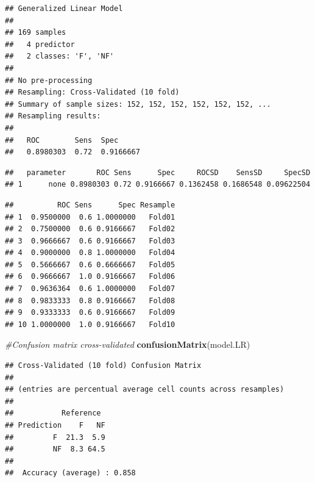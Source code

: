 \documentclass[
]{book}
\newenvironment{Shaded}{\begin{snugshade}}{\end{snugshade}}
\newcommand{\CommentTok}[1]{\textcolor[rgb]{0.56,0.35,0.01}{\textit{#1}}}
\newcommand{\FunctionTok}[1]{\textcolor[rgb]{0.13,0.29,0.53}{\textbf{#1}}}
\newcommand{\NormalTok}[1]{#1}
\newcommand{\SpecialCharTok}[1]{\textcolor[rgb]{0.81,0.36,0.00}{\textbf{#1}}}
\newcounter{none} %
\begin{document}
\begin{verbatim}
## Generalized Linear Model 
## 
## 169 samples
##   4 predictor
##   2 classes: 'F', 'NF' 
## 
## No pre-processing
## Resampling: Cross-Validated (10 fold) 
## Summary of sample sizes: 152, 152, 152, 152, 152, 152, ... 
## Resampling results:
## 
##   ROC        Sens  Spec     
##   0.8980303  0.72  0.9166667
\end{verbatim}

\begin{Shaded}
\end{Shaded}

\begin{verbatim}
##   parameter       ROC Sens      Spec     ROCSD    SensSD     SpecSD
## 1      none 0.8980303 0.72 0.9166667 0.1362458 0.1686548 0.09622504
\end{verbatim}

\begin{Shaded}
\end{Shaded}

\begin{verbatim}
##          ROC Sens      Spec Resample
## 1  0.9500000  0.6 1.0000000   Fold01
## 2  0.7500000  0.6 0.9166667   Fold02
## 3  0.9666667  0.6 0.9166667   Fold03
## 4  0.9000000  0.8 1.0000000   Fold04
## 5  0.5666667  0.6 0.6666667   Fold05
## 6  0.9666667  1.0 0.9166667   Fold06
## 7  0.9636364  0.6 1.0000000   Fold07
## 8  0.9833333  0.8 0.9166667   Fold08
## 9  0.9333333  0.6 0.9166667   Fold09
## 10 1.0000000  1.0 0.9166667   Fold10
\end{verbatim}

\begin{Shaded}
\begin{Highlighting}[]
\CommentTok{\#Confusion matrix cross{-}validated}
\FunctionTok{confusionMatrix}\NormalTok{(model.LR)}
\end{Highlighting}
\end{Shaded}

\begin{verbatim}
## Cross-Validated (10 fold) Confusion Matrix 
## 
## (entries are percentual average cell counts across resamples)
##  
##           Reference
## Prediction    F   NF
##         F  21.3  5.9
##         NF  8.3 64.5
##                            
##  Accuracy (average) : 0.858
\end{verbatim}
\end{document}
